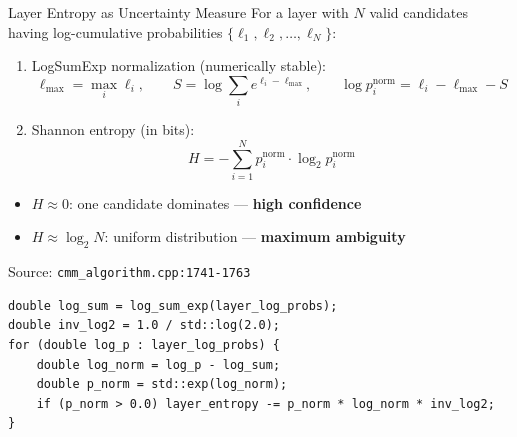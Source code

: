 \documentclass[10pt,aspectratio=169]{beamer}
\begin{document}
\begin{frame}{Layer Entropy as Uncertainty Measure}
  For a layer with $N$ valid candidates having log-cumulative probabilities
  $\{ \ell_1, \ell_2, \dots, \ell_N \}$:

  \begin{enumerate}
    \item LogSumExp normalization (numerically stable):
    \begin{equation*}
      \ell_{\max} = \max_i \ell_i, \qquad
      S = \log\sum_i e^{\ell_i - \ell_{\max}}, \qquad
      \log p_i^{\text{norm}} = \ell_i - \ell_{\max} - S
    \end{equation*}

    \item Shannon entropy (in bits):
    \begin{equation*}
      H = -\sum_{i=1}^{N} p_i^{\text{norm}} \cdot \log_2 p_i^{\text{norm}}
    \end{equation*}
  \end{enumerate}

  \begin{itemize}
    \item $H \approx 0$: one candidate dominates — \textbf{high confidence}
    \item $H \approx \log_2 N$: uniform distribution — \textbf{maximum ambiguity}
  \end{itemize}

  \vspace{0.3cm}
  \begin{block}{Source: \texttt{cmm\_algorithm.cpp:1741-1763}}
    \begin{lstlisting}[basicstyle=\ttfamily\scriptsize]
double log_sum = log_sum_exp(layer_log_probs);
double inv_log2 = 1.0 / std::log(2.0);
for (double log_p : layer_log_probs) {
    double log_norm = log_p - log_sum;
    double p_norm = std::exp(log_norm);
    if (p_norm > 0.0) layer_entropy -= p_norm * log_norm * inv_log2;
}
    \end{lstlisting}
  \end{block}
\end{frame}

\end{document}
